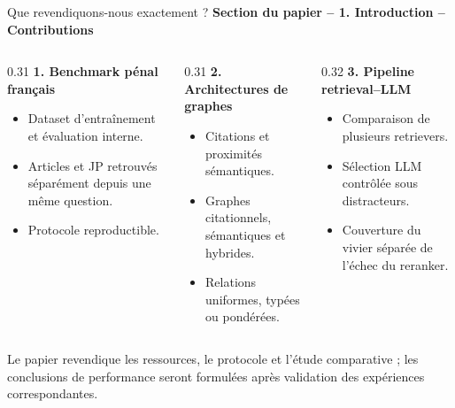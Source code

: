 \documentclass[aspectratio=169,10pt]{beamer}
\newcommand{\keybox}[1]{%
  \begin{center}
  \colorbox{accentsoft}{\parbox{0.92\linewidth}{\centering #1}}
  \end{center}}
\newcommand{\papersection}[1]{%
  {\scriptsize\textcolor{accent}{\textbf{Section du papier -- #1}}}\par\vspace{0.55em}}
\begin{document}
\begin{frame}{Que revendiquons-nous exactement ?}
  \papersection{1. Introduction -- Contributions}
  \scriptsize
  \begin{columns}[T,onlytextwidth]
    \begin{column}{0.31\textwidth}
      \textbf{\color{accent}1. Benchmark pénal français}
      \begin{itemize}\setlength{\itemsep}{0.32em}
        \item Dataset d'entraînement et évaluation interne.
        \item Articles et JP retrouvés séparément depuis une même question.
        \item Protocole reproductible.
      \end{itemize}
    \end{column}
    \begin{column}{0.31\textwidth}
      \textbf{\color{ok}2. Architectures de graphes}
      \begin{itemize}\setlength{\itemsep}{0.32em}
        \item Citations et proximités sémantiques.
        \item Graphes citationnels, sémantiques et hybrides.
        \item Relations uniformes, typées ou pondérées.
      \end{itemize}
    \end{column}
    \begin{column}{0.32\textwidth}
      \textbf{\color{crosscol}3. Pipeline retrieval--LLM}
      \begin{itemize}\setlength{\itemsep}{0.32em}
        \item Comparaison de plusieurs retrievers.
        \item Sélection LLM contrôlée sous distracteurs.
        \item Couverture du vivier séparée de l'échec du reranker.
      \end{itemize}
    \end{column}
  \end{columns}

  \vspace{0.8em}
  \keybox{\scriptsize Le papier revendique les ressources, le protocole et l'étude comparative ;
  les conclusions de performance seront formulées après validation des expériences correspondantes.}
\end{frame}
\end{document}
